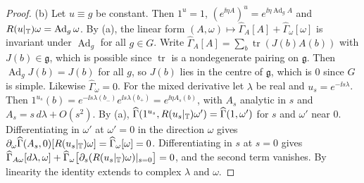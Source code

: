\begin{proof}
(b) Let $u\equiv g$ be constant. Then $1^u=1$, $(e^{\ii\eta A})^u=e^{\ii\eta\operatorname{Ad}_gA}$ and $R(u|_\mathbb T)\omega=\operatorname{Ad}_g\omega$. By (a), the linear form $(A,\omega)\mapsto\widehat\Gamma_A[A]+\widehat\Gamma_\omega[\omega]$ is invariant under $\operatorname{Ad}_g$ for all $g\in G$. Write $\widehat\Gamma_A[A]=\sum_b\operatorname{tr}(J(b)A(b))$ with $J(b)\in\mathfrak g$, which is possible since $\operatorname{tr}$ is a nondegenerate pairing on $\mathfrak g$. Then $\operatorname{Ad}_gJ(b)=J(b)$ for all $g$, so $J(b)$ lies in the centre of $\mathfrak g$, which is $0$ since $G$ is simple. Likewise $\widehat\Gamma_\omega=0$. For the mixed derivative let $\lambda$ be real and $u_s=e^{-\ii s\lambda}$. Then $1^{u_s}(b)=e^{-\ii s\lambda(b_-)}e^{\ii s\lambda(b_+)}=e^{\ii\eta A_s(b)}$, with $A_s$ analytic in $s$ and $A_s=s\,d\lambda+O(s^2)$. By (a), $\widehat\Gamma(1^{u_s},R(u_s|_\mathbb T)\omega')=\widehat\Gamma(1,\omega')$ for $s$ and $\omega'$ near $0$. Differentiating in $\omega'$ at $\omega'=0$ in the direction $\omega$ gives $\partial_\omega\widehat\Gamma(A_s,0)[R(u_s|_\mathbb T)\omega]=\widehat\Gamma_\omega[\omega]=0$. Differentiating in $s$ at $s=0$ gives $\widehat\Gamma_{A\omega}[d\lambda,\omega]+\widehat\Gamma_\omega\big[\partial_s(R(u_s|_\mathbb T)\omega)|_{s=0}\big]=0$, and the second term vanishes. By linearity the identity extends to complex $\lambda$ and $\omega$.


\end{proof}
